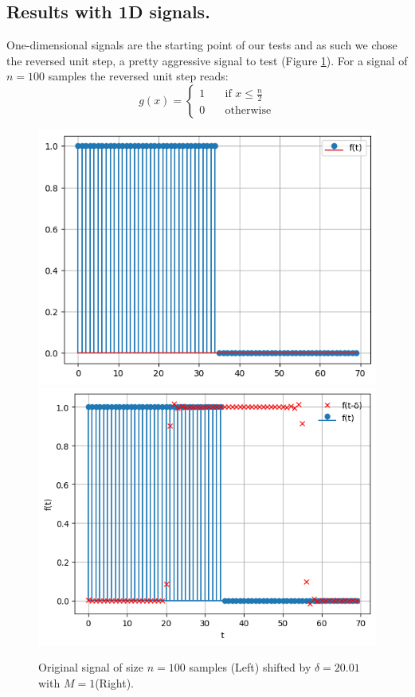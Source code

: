\documentclass[]{usiinfbachelorproject}
\begin{document}
		\subsection{Results with 1D signals.}
		One-dimensional signals are the starting point of our tests and as such we chose the reversed unit step, a pretty aggressive signal to test (Figure \ref{fig:original_signal}). For a signal of $n=100$ samples the reversed unit step reads:
		\begin{equation*}
			g(x) = 
			\begin{cases}
				1	& \quad \text{if } x \leq \frac{n}{2}\\
				0	& \quad \text{otherwise}
			\end{cases}
		\end{equation*}
		\begin{figure}
			\centering
			\includegraphics[height=0.35\columnwidth]{images/original_signal.png}
			\includegraphics[height=0.35\columnwidth]{images/Results/M_1_small_shift.png}
			\caption{Original signal of size $n=100$ samples (Left) shifted by $\delta = 20.01$ with $M=1$(Right).}
			\label{fig:original_signal}
		\end{figure}
		
\end{document}
